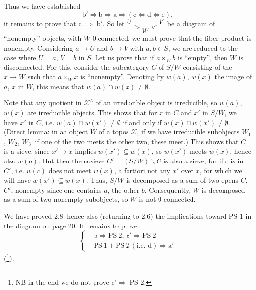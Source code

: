\documentclass[11pt]{article}
\newcommand{\printedpage}[1]{\marginpar{\footnotesize p.~#1}}
\newcommand{\msp}[1]{\marginpar{\footnotesize [#1]}}
\newcommand{\X}{\mathcal{X}}
\begin{document}
Thus we have established
\[
\mathrm{b}'\Longrightarrow\mathrm{b}\Longrightarrow\mathrm{a}\Longrightarrow(\mathrm{c}\Longleftrightarrow\mathrm{d}\Longleftrightarrow\mathrm{e}),
\]
it remains to prove that c $\Longrightarrow$ b$'$. So let $\begin{tikzcd}[cramped, row sep=0.1em, column sep=0.8em, baseline=(current bounding box.center)] U \arrow[dr] & & V \arrow[dl] \\ & W & \end{tikzcd}$ be a diagram of ``nonempty'' objects, with $W$ 0-connected, we must prove that the fiber product is nonempty. Considering $a\longrightarrow U$ and $b\longrightarrow V$ with $a,b\in S$, we are reduced to the case where $U=a$, $V=b$ in $S$. Let us prove that if $a\times_W b$ is ``empty'', then $W$ is disconnected. For this, consider the subcategory $C$ of $S/W$ consisting of the $x\longrightarrow W$ such that $a\times_W x$ is ``nonempty''. Denoting by $w(a)$, $w(x)$ the image of $a$, $x$ in $W$, this means that $w(a)\cap w(x)\neq\emptyset$.

\msp{page 23}Note that any quotient in $\X^\wedge$ of an irreducible object is irreducible, so $w(a)$, $w(x)$ are irreducible objects. This shows that for $x$ in $C$ and $x'$ in $S/W$, we have $x'$ in $C$, i.e. $w(a)\cap w(x')\neq\emptyset$ if and only if $w(x)\cap w(x')\neq\emptyset$. (Direct lemma: in an object $W$ of a topos $\X$, if we have irreducible subobjects $W_1$, $W_2$, $W_3$, if one of the two meets the other two, these meet.) This shows that $C$ is a sieve, since $x'\longrightarrow x$ implies $w(x')\subseteq w(x)$, so $w(x')$ meets $w(x)$, hence also $w(a)$. But then the cosieve $C'=(S/W)\backslash C$ is also a sieve, for if $c$
\printedpage{15}
is in $C'$, i.e. $w(c)$ does not meet $w(x)$, a fortiori not any $x'$ over $x$, for which we will have $w(x')\subseteq w(x)$. Thus, $S/W$ is decomposed as a sum of two opens $C$, $C'$, nonempty since one contains $a$, the other $b$. Consequently, $W$ is decomposed as a sum of two nonempty subobjects, so $W$ is not 0-connected.

We have proved 2.8, hence also (returning to 2.6) the implications toward PS 1 in the diagram on page 20. It remains to prove
\[
\left\{
\begin{aligned}
&\mathrm{b}\Longrightarrow\mathrm{PS}\ 2,\ \mathrm{c}'\Longrightarrow\mathrm{PS}\ 2\\
&\mathrm{PS}\ 1+\mathrm{PS}\ 2\ (\text{i.e. d})\Longrightarrow\mathrm{a}'
\end{aligned}
\right.
\]
(\footnote[32]{NB in the end we do not prove c$'\Longrightarrow$ PS 2.}).
\end{document}
